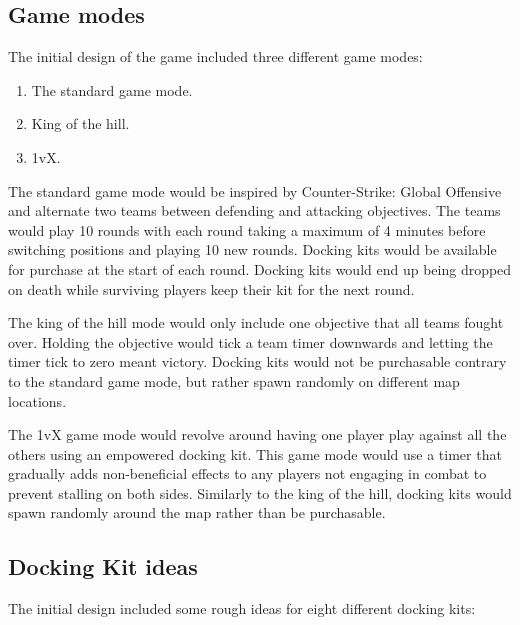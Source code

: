 \subsection{Game modes}
The initial design of the game included three different game modes: 

\begin{enumerate}
    \item The standard game mode.
    \item King of the hill.
    \item 1vX. 
\end{enumerate}

The standard game mode would be inspired by Counter-Strike: Global Offensive~\cite{csGO} and alternate two teams between defending and attacking objectives. The teams would play 10 rounds with each round taking a maximum of 4 minutes before switching positions and playing 10 new rounds. Docking kits would be available for purchase at the start of each round. Docking kits would end up being dropped on death while surviving players keep their kit for the next round.

The king of the hill mode would only include one objective that all teams fought over. Holding the objective would tick a team timer downwards and letting the timer tick to zero meant victory. Docking kits would not be purchasable contrary to the standard game mode, but rather spawn randomly on different map locations. 
    
The 1vX game mode would revolve around having one player play against all the others using an empowered docking kit. This game mode would use a timer that gradually adds non-beneficial effects to any players not engaging in combat to prevent stalling on both sides. Similarly to the king of the hill, docking kits would spawn randomly around the map rather than be purchasable.  

\subsection{Docking Kit ideas}
The initial design included some rough ideas for eight different docking kits:

